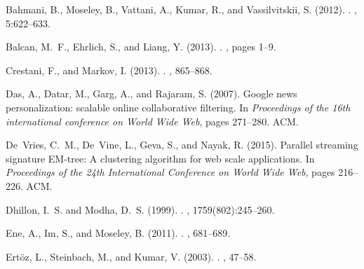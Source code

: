 \documentclass[a4paper]{article}
\begin{document}

% 
\begin{thebibliography}{}

Bahmani, B., Moseley, B., Vattani, A., Kumar, R., and Vassilvitskii, S. (2012).
.
, 5:622--633.

Balcan, M.~F., Ehrlich, S., and Liang, Y. (2013).
.
, pages 1--9.

Crestani, F., and Markov, I. (2013).
.
, 865--868.

Das, A., Datar, M., Garg, A., and Rajaram, S. (2007).
\newblock Google news personalization: scalable online collaborative filtering.
\newblock In {\em Proceedings of the 16th international conference on World
  Wide Web}, pages 271--280. ACM.

De~Vries, C.~M., De~Vine, L., Geva, S., and Nayak, R. (2015).
\newblock Parallel streaming signature {EM}-tree: A clustering algorithm for web
  scale applications.
\newblock In {\em Proceedings of the 24th International Conference on World
  Wide Web}, pages 216--226. ACM.

Dhillon, I.~S. and Modha, D.~S. (1999).
.
, 1759(802):245--260.

Ene, A., Im, S., and Moseley, B. (2011).
.
, 681--689.

Ert{\"o}z, L., Steinbach, M., and Kumar, V. (2003).
.
, 47--58.



\end{thebibliography}
\end{document}
